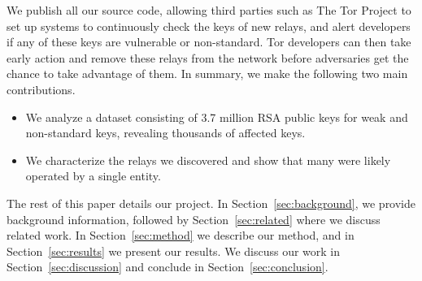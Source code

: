 We publish all our source code, allowing third parties such as The Tor Project
to set up systems to continuously check the keys of new relays, and alert
developers if any of these keys are vulnerable or non-standard.  Tor developers
can then take early action and remove these relays from the network before
adversaries get the chance to take advantage of them.  In summary, we make the
following two main contributions.
\begin{itemize}
	\item We analyze a dataset consisting of 3.7 million RSA public keys for
		weak and non-standard keys, revealing thousands of affected keys.

	\item We characterize the relays we discovered and show that many were
		likely operated by a single entity.
\end{itemize}

The rest of this paper details our project.  In Section~\ref{sec:background}, we
provide background information, followed by Section~\ref{sec:related} where we 
discuss related work.  In Section~\ref{sec:method} we describe our method,
and in Section~\ref{sec:results} we present our results.  We discuss our work in
Section~\ref{sec:discussion} and conclude in Section~\ref{sec:conclusion}.
